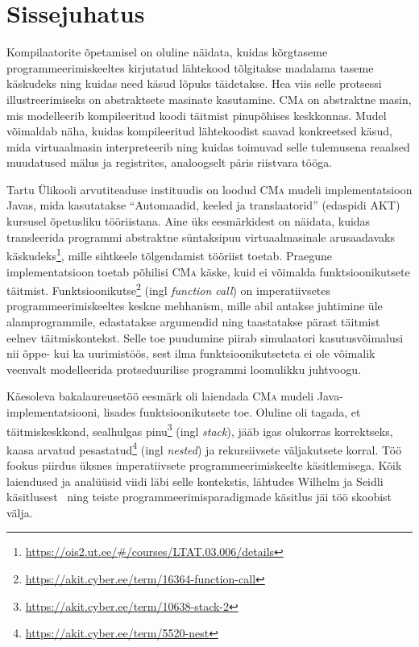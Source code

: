 ﻿\section*{Sissejuhatus}\label{sissejuhatus} 

Kompilaatorite õpetamisel on oluline näidata, kuidas kõrgtaseme programmeerimiskeeltes kirjutatud lähtekood tõlgitakse madalama taseme käskudeks ning kuidas need käsud lõpuks täidetakse. Hea viis selle protsessi illustreerimiseks on abstraktsete masinate kasutamine. \textsc{CMa} on abstraktne masin, mis modelleerib kompileeritud koodi täitmist pinupõhises keskkonnas. Mudel võimaldab näha, kuidas kompileeritud lähtekoodist saavad konkreetsed käsud, mida virtuaalmasin interpreteerib ning kuidas toimuvad selle tulemusena reaalsed muudatused mälus ja registrites, analoogselt päris riistvara tööga.

Tartu Ülikooli arvutiteaduse instituudis on loodud \textsc{CMa} mudeli implementatsioon Javas, mida kasutatakse ``Automaadid, keeled ja translaatorid'' (edaspidi AKT) kursusel õpetusliku tööriistana. Aine üks eesmärkidest on näidata, kuidas transleerida programmi abstraktne süntaksipuu virtuaalmasinale arusaadavaks käskudeks\footnote{\url{https://ois2.ut.ee/\#/courses/LTAT.03.006/details}}, mille sihtkeele tõlgendamist tööriist toetab. Praegune implementatsioon toetab põhilisi \textsc{CMa} käske, kuid ei võimalda funktsioonikutsete täitmist. Funktsioonikutse\footnote{\url{https://akit.cyber.ee/term/16364-function-call}} (ingl \emph{function call}) on imperatiivsetes programmeerimiskeeltes keskne mehhanism, mille abil antakse juhtimine üle alamprogrammile, edastatakse argumendid ning taastatakse pärast täitmist eelnev täitmiskontekst. Selle toe puudumine piirab simulaatori kasutusvõimalusi nii õppe- kui ka uurimistöös, sest ilma funktsioonikutseteta ei ole võimalik veenvalt modelleerida protseduurilise programmi loomulikku juhtvoogu.

Käesoleva bakalaureusetöö eesmärk oli laiendada \textsc{CMa} mudeli Java-implementatsiooni, lisades funktsioonikutsete toe. Oluline oli tagada, et täitmiskeskkond, sealhulgas pinu\footnote{\url{https://akit.cyber.ee/term/10638-stack-2}} (ingl \emph{stack}), jääb igas olukorras korrektseks, kaasa arvatud pesastatud\footnote{\url{https://akit.cyber.ee/term/5520-nest}} (ingl \emph{nested}) ja rekursiivsete väljakutsete korral. Töö fookus piirdus üksnes imperatiivsete programmeerimiskeelte käsitlemisega. Kõik laiendused ja analüüsid viidi läbi selle kontekstis, lähtudes Wilhelm ja Seidli käsitlusest~\cite{wilhelm_imperative_2010} ning teiste programmeerimisparadigmade käsitlus jäi töö skoobist välja.

